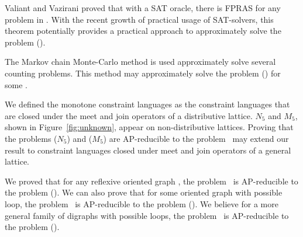 Valiant and Vazirani \cite{valvaz} proved that with a SAT oracle, there is FPRAS for any 
problem in \cp\@. With the recent growth of practical usage of SAT-solvers, this theorem
potentially provides a practical approach to approximately solve the problem \ccsp(\mrelset).

The Markov chain Monte-Carlo method is used approximately solve several counting problems.
This method may approximately solve the problem \ccsp(\mrelset) for some \mrelset\@.

We defined the monotone constraint languages as the constraint languages that
are closed under the meet and join operators of a distributive lattice.
\(N_5\) and \(M_5\), shown in Figure~\ref{fig:unknown}, appear on non-distributive 
lattices. Proving that the problems \chom(\(N_5\)) and \chom(\(M_5\)) are AP-reducible to
the problem \cbis\ may extend our result to
constraint languages closed under meet and join operators of a general lattice.

We proved that for any reflexive oriented graph \mH, the problem \cbis\ is
AP-reducible to the problem \chom(\mH). We can also prove that for some
oriented graph with possible loop, the problem \cbis\ is AP-reducible to 
the problem \chom(\mH). We believe for a more general family of digraphs
with possible loops, the problem \cbis\ is AP-reducible to the problem \chom(\mH).